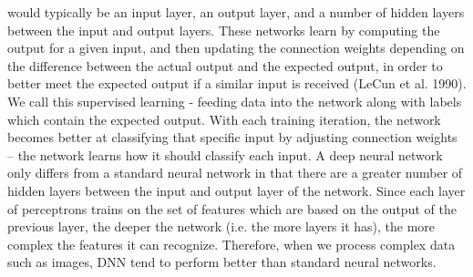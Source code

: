 \documentclass[12pt,a4paper]{article}
\begin{document}
would typically be an input layer, an output layer, and a number of hidden layers between the
input and output layers. These networks learn by computing the output for a given input, and
then updating the connection weights depending on the difference between the actual output
and the expected output, in order to better meet the expected output if a similar input is
received (LeCun et al. 1990). We call this supervised learning - feeding data into the network
along with labels which contain the expected output. With each training iteration, the network
becomes better at classifying that specific input by adjusting connection weights – the
network learns how it should classify each input.
A deep neural network only differs from a standard neural network in that there are a
greater number of hidden layers between the input and output layer of the network. Since
each layer of perceptrons trains on the set of features which are based on the output of the
previous layer, the deeper the network (i.e. the more layers it has), the more complex the
features it can recognize. Therefore, when we process complex data such as images, DNN
tend to perform better than standard neural networks. 
\end{document}

